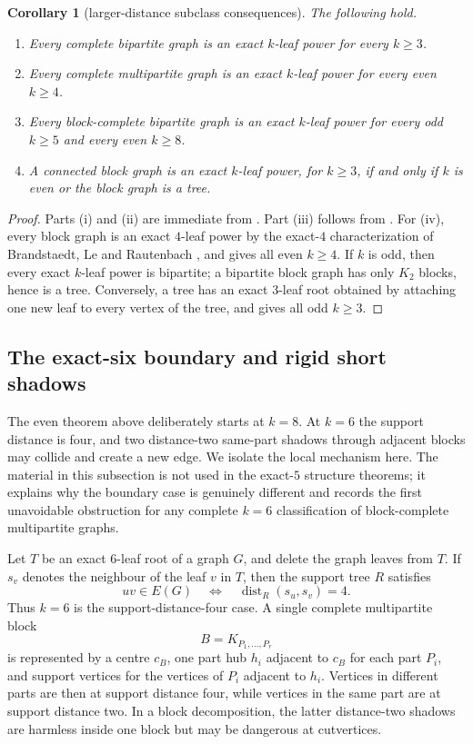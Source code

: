 \documentclass[11pt]{article}
\newtheorem{corollary}[theorem]{Corollary}
\theoremstyle{definition}
\newcommand{\dist}{\operatorname{dist}}
\begin{document}
\begin{corollary}[larger-distance subclass consequences]\label{cor:larger-distance-subclasses}
The following hold.
\begin{enumerate}[label=\textup{(\roman*)}]
\item Every complete bipartite graph is an exact $k$-leaf power for every $k\ge3$.
\item Every complete multipartite graph is an exact $k$-leaf power for every even $k\ge4$.
\item Every block-complete bipartite graph is an exact $k$-leaf power for every odd $k\ge5$ and every even $k\ge8$.
\item A connected block graph is an exact $k$-leaf power, for $k\ge3$, if and only if $k$ is even or the block graph is a tree.
\end{enumerate}
\end{corollary}

\begin{proof}
Parts (i) and (ii) are immediate from .  Part (iii) follows from .  For (iv), every block graph is an exact $4$-leaf power by the exact-$4$ characterization of Brandstaedt, Le and Rautenbach \cite[Theorem~2]{BLR2010}, and  gives all even $k\ge4$.  If $k$ is odd, then every exact $k$-leaf power is bipartite; a bipartite block graph has only $K_2$ blocks, hence is a tree.  Conversely, a tree has an exact $3$-leaf root obtained by attaching one new leaf to every vertex of the tree, and  gives all odd $k\ge3$.
\end{proof}


\subsection{The exact-six boundary and rigid short shadows}\label{subsec:k6-boundary}

The even theorem above deliberately starts at $k=8$.  At $k=6$ the support distance is four, and two distance-two same-part shadows through adjacent blocks may collide and create a new edge.  We isolate the local mechanism here.  The material in this subsection is not used in the exact-$5$ structure theorems; it explains why the boundary case is genuinely different and records the first unavoidable obstruction for any complete $k=6$ classification of block-complete multipartite graphs.

Let $T$ be an exact $6$-leaf root of a graph $G$, and delete the graph leaves from $T$.  If $s_v$ denotes the neighbour of the leaf $v$ in $T$, then the support tree $R$ satisfies
\[
 uv\in E(G) \quad\Longleftrightarrow\quad \dist_R(s_u,s_v)=4.
\]
Thus $k=6$ is the support-distance-four case.  A single complete multipartite block
\[
 B=K_{P_1,\ldots,P_r}
\]
is represented by a centre $c_B$, one part hub $h_i$ adjacent to $c_B$ for each part $P_i$, and support vertices for the vertices of $P_i$ adjacent to $h_i$.  Vertices in different parts are then at support distance four, while vertices in the same part are at support distance two.  In a block decomposition, the latter distance-two shadows are harmless inside one block but may be dangerous at cutvertices.
\end{document}
